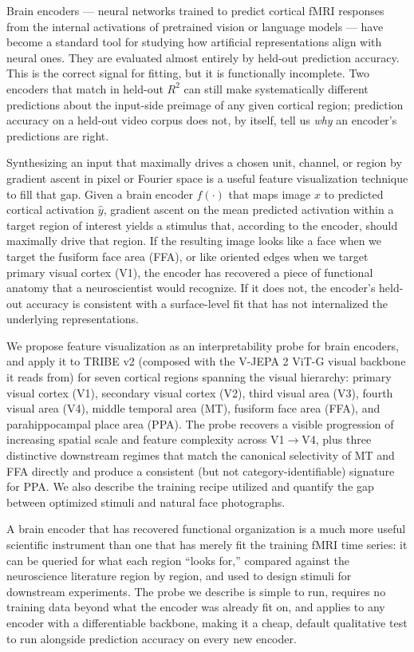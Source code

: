 \documentclass{article}
\begin{document}
Brain encoders --- neural networks trained to predict cortical fMRI responses from the internal activations of pretrained vision or language models \citep{yamins2016goaldriven,schrimpf2020brainscore} --- have become a standard tool for studying how artificial representations align with neural ones. They are evaluated almost entirely by held-out prediction accuracy. This is the correct signal for fitting, but it is functionally incomplete. Two encoders that match in held-out $R^2$ can still make systematically different predictions about the input-side preimage of any given cortical region; prediction accuracy on a held-out video corpus does not, by itself, tell us \emph{why} an encoder's predictions are right.

Synthesizing an input that maximally drives a chosen unit, channel, or region by gradient ascent in pixel or Fourier space \citep{erhan2009visualizing,simonyan2013deep,olah2017featurevis} is a useful feature visualization technique to fill that gap. Given a brain encoder $f(\cdot)$ that maps image $x$ to predicted cortical activation $\hat{y}$, gradient ascent on the mean predicted activation within a target region of interest yields a stimulus that, according to the encoder, should maximally drive that region. If the resulting image looks like a face when we target the fusiform face area (FFA), or like oriented edges when we target primary visual cortex (V1), the encoder has recovered a piece of functional anatomy that a neuroscientist would recognize. If it does not, the encoder's held-out accuracy is consistent with a surface-level fit that has not internalized the underlying representations.

We propose feature visualization as an interpretability probe for brain encoders, and apply it to TRIBE v2 (composed with the V-JEPA 2 ViT-G visual backbone it reads from) for seven cortical regions spanning the visual hierarchy: primary visual cortex (V1), secondary visual cortex (V2), third visual area (V3), fourth visual area (V4), middle temporal area (MT), fusiform face area (FFA), and parahippocampal place area (PPA). The probe recovers a visible progression of increasing spatial scale and feature complexity across V1$\to$V4, plus three distinctive downstream regimes that match the canonical selectivity of MT and FFA directly and produce a consistent (but not category-identifiable) signature for PPA. We also describe the training recipe utilized and quantify the gap between optimized stimuli and natural face photographs.

A brain encoder that has recovered functional organization is a much more useful scientific instrument than one that has merely fit the training fMRI time series: it can be queried for what each region ``looks for,'' compared against the neuroscience literature region by region, and used to design stimuli for downstream experiments. The probe we describe is simple to run, requires no training data beyond what the encoder was already fit on, and applies to any encoder with a differentiable backbone, making it a cheap, default qualitative test to run alongside prediction accuracy on every new encoder.
\end{document}
